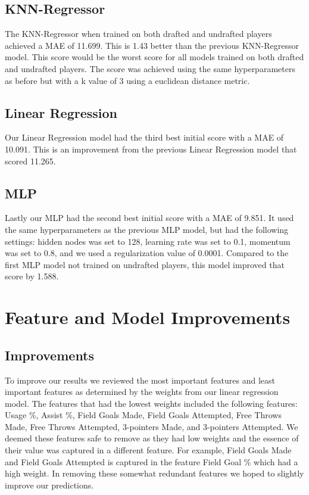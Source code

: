 \documentclass{article}
\begin{document}
\subsection{KNN-Regressor}

The KNN-Regressor when trained on both drafted and undrafted players achieved a
MAE of 11.699. This is 1.43 better than the previous KNN-Regressor model. This
score would be the worst score for all models trained on both drafted and
undrafted players. The score was achieved using the same hyperparameters as
before but with a k value of 3 using a euclidean distance metric.

\subsection{Linear Regression}

Our Linear Regression model had the third best initial score with a MAE of
10.091. This is an improvement from the previous Linear Regression model that
scored 11.265.

\subsection{MLP}

Lastly our MLP had the second best initial score with a MAE of 9.851. It used
the same hyperparameters as the previous MLP model, but had the following
settings: hidden nodes was set to 128, learning rate was set to 0.1, momentum
was set to 0.8, and we used a regularization value of 0.0001. Compared to the
first MLP model not trained on undrafted players, this model improved that score
by 1.588.

\section{Feature and Model Improvements}

\subsection{Improvements}

To improve our results we reviewed the most important features and least
important features as determined by the weights from our linear regression
model. The features that had the lowest weights included the following features:
Usage \%, Assist \%, Field Goals Made, Field Goals Attempted, Free Throws Made,
Free Throws Attempted, 3-pointers Made, and 3-pointers Attempted. We deemed
these features safe to remove as they had low weights and the essence of their
value was captured in a different feature. For example, Field Goals Made and
Field Goals Attempted is captured in the feature Field Goal \% which had a high
weight. In removing these somewhat redundant features we hoped to slightly
improve our predictions.
\end{document}
